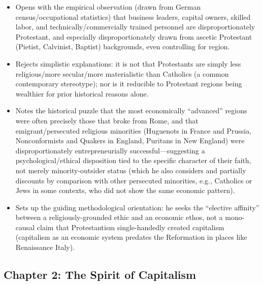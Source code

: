 \documentclass[12pt]{article}
\begin{document}
\begin{itemize}[leftmargin=*, itemsep=4pt]
    \item Opens with the empirical observation (drawn from German census/occupational statistics) that business leaders, capital owners, skilled labor, and technically/commercially trained personnel are disproportionately Protestant, and especially disproportionately drawn from ascetic Protestant (Pietist, Calvinist, Baptist) backgrounds, even controlling for region.
    \item Rejects simplistic explanations: it is not that Protestants are simply less religious/more secular/more materialistic than Catholics (a common contemporary stereotype); nor is it reducible to Protestant regions being wealthier for prior historical reasons alone.
    \item Notes the historical puzzle that the most economically ``advanced'' regions were often precisely those that broke from Rome, and that emigrant/persecuted religious minorities (Huguenots in France and Prussia, Nonconformists and Quakers in England, Puritans in New England) were disproportionately entrepreneurially successful---suggesting a psychological/ethical disposition tied to the specific character of their faith, not merely minority-outsider status (which he also considers and partially discounts by comparison with other persecuted minorities, e.g., Catholics or Jews in some contexts, who did not show the same economic pattern).
    \item Sets up the guiding methodological orientation: he seeks the ``elective affinity'' between a religiously-grounded ethic and an economic ethos, not a mono-causal claim that Protestantism single-handedly created capitalism (capitalism as an economic system predates the Reformation in places like Renaissance Italy).
\end{itemize}

\subsection*{Chapter 2: The Spirit of Capitalism}
\end{document}

